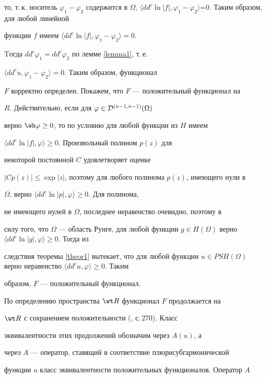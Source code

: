 \begin{pf}
то, т.\,к. носитель $\varphi_1-\varphi_2$ содержится в $\Omega$, $\langle 


dd^c\ln|f|,\varphi_1-\varphi_2\rangle$=0. Таким образом, для любой линейной 


функции $f$ имеем $\langle dd^c\ln|f|,\varphi_1-\varphi_2\rangle{=}0$.


Tогда  $dd^c\varphi_1=dd^c \varphi_2$ по лемме \ref{lemma1}, т.\,е. 


$\langle dd^cu, \varphi_1-\varphi_2\rangle=0$. Таким образом, функционал 


$F$ корректно определен. Покажем, что $F$ --- положительный функционал на 


$R$. Действительно, если для $\varphi\in {\cal D}^{(n-1,n-1)}(\Omega)$ 


верно $\wh\varphi\ge 0$, то по условию для любой функции из $H$ имеем 


$\langle dd^c\ln |f|, \varphi\rangle{\ge} 0$. Произвольный полином $p(z)$ для 


некоторой постоянной $C$ удовлетворяет оценке


$|Cp(z)|\le \exp |z|$, поэтому для любого полинома $p(z)$, имеющего нули в 


$\Omega$, верно $\langle dd^c\ln |p|, \varphi\rangle\ge 0$. Для полинома, 


не имеющего нулей в $\Omega$, последнее неравенство очевидно, поэтому в 


силу того, что $\Omega$ --- область Рунге, для любой функции $g\in 


H(\Omega)$ верно $\langle dd^c\ln |g|, \varphi\rangle\ge 0$. Тогда из 


следствия теоремы \ref{theor1} вытекает, что для любой функции $u\in 


PSH(\Omega)$ верно неравенство $\langle dd^c u, \varphi\rangle\ge 0$. Таким 


образом, $F$ --- положительный функционал. 





По определению пространства $\wt R$ функционал $F$ продолжается на 


$\wt R$ с сохранением положительности (\cite{Mej}, с.\,270). Класс 


эквивалентности этих продолжений обозначим через $A(u)$, а


через $A$ --- оператор, ставящий в соответствие плюрисубгармонической 


функции $u$ класс эквивалентности положительных функционалов. Оператор $A$ 



\end{pf}
